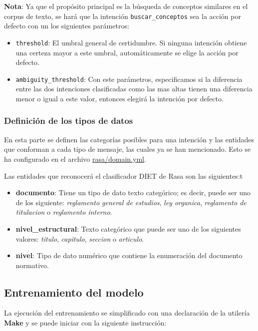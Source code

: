 \textbf{Nota}: Ya que el propósito principal es la búsqueda de conceptos similares en el corpus de texto, se hará que la intención \verb|buscar_conceptos| sea la acción por defecto con un los siguientes parámetros:
\begin{itemize}
    \item \verb|threshold|: El umbral general de certidumbre. Si ninguna intención obtiene una certeza mayor a este umbral, automáticamente se elige la acción por defecto.
    \item \verb|ambiguity_threshold|: Con este parámetros, especificamos si la diferencia entre las dos intenciones clasificadas como las mas altas tienen una diferencia menor o igual a este valor, entonces elegirá la intención por defecto.
\end{itemize}

\subsubsection{Definición de los tipos de datos}

En esta parte se definen las categorías posibles para una intención y las entidades que conforman a cada tipo de mensaje, las cuales ya se han mencionado. Esto se ha configurado en el archivo \href{https://github.com/AranGarcia/milo-bot/blob/master/rasa/domain.yml}{rasa/domain.yml}.

Las entidades que reconocerá el clasificador DIET de Rasa son las siguientes:t
\begin{itemize}
    \item \textbf{documento}: Tiene un tipo de dato texto categórico; es decir, puede ser uno de los siguiente: \textit{reglamento general de estudios}, \textit{ley organica}, \textit{reglamento de titulacion} o \textit{reglamento interno}.
    \item \textbf{nivel\_estructural}: Texto categórico que puede ser uno de los siguientes valores: \textit{titulo}, \textit{capitulo}, \textit{seccion} o \textit{articulo}.
    \item \textbf{nivel}: Tipo de dato numérico que contiene la enumeración del documento normativo.
\end{itemize}

\subsection{Entrenamiento del modelo}

La ejecución del entrenamiento se simplificado con una declaración de la utilería \textbf{Make} y se puede iniciar con la siguiente instrucción:

